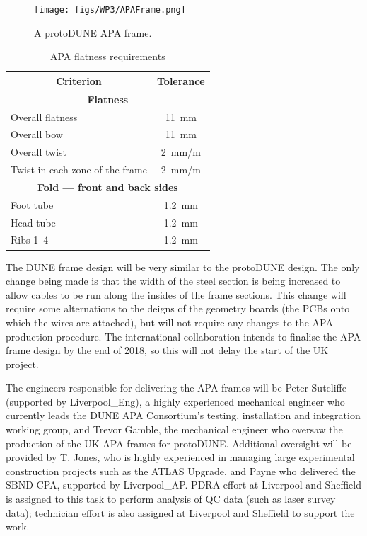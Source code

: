 \begin{figure}
    \centering
    \texttt{[image: figs/WP3/APAFrame.png]}
    \caption{A protoDUNE APA frame.}
    \label{fig:APAFrame}
\end{figure}

\begin{table}
\centering
\begin{tabular}{|l|c|}
\hline
    \multicolumn{1}{|c|}{\bf Criterion} & {\bf Tolerance} \\ \hline
    \multicolumn{2}{|c|}{\bf Flatness}\\
    Overall flatness & \SI{11}{\milli\metre} \\
    Overall bow & \SI{11}{\milli\metre}\\
    Overall twist & \SI{2}{\milli\metre / \metre}\\
    Twist in each zone of the frame & \SI{2}{\milli\metre / \metre}\\ \hline
    \multicolumn{2}{|c|}{\bf Fold --- front and back sides}\\
    Foot tube & \SI{1.2}{\milli\metre}\\
    Head tube & \SI{1.2}{\milli\metre}\\
    Ribs 1--4 & \SI{1.2}{\milli\metre}\\
    \hline
\end{tabular}
\caption{APA flatness requirements}
\label{tab:APAFlatness}
\end{table}

The DUNE frame design will be very similar to the protoDUNE design. The only change being made is that the width of the steel section is being increased to allow cables to be run along the insides of the frame sections. This change will require some alternations to the deigns of the geometry boards (the PCBs onto which the wires are attached), but will not require any changes to the APA production procedure. The international collaboration intends to finalise the APA frame design by the end of 2018, so this will not delay the start of the UK project.

The engineers responsible for delivering the APA frames will be Peter Sutcliffe (supported by Liverpool\_Eng), a highly experienced mechanical engineer who currently leads the DUNE APA Consortium's testing, installation and integration working group, and Trevor Gamble, the mechanical engineer who oversaw the production of the UK APA frames for protoDUNE. Additional oversight will be provided by T. Jones, who is highly experienced in managing large experimental construction projects such as the ATLAS Upgrade, and Payne who delivered the SBND CPA, supported by Liverpool\_AP. PDRA effort at Liverpool and Sheffield is assigned to this task to perform analysis of QC data (such as laser survey data); technician effort is also assigned at Liverpool and Sheffield to support the work.

